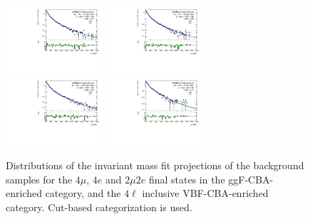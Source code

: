 \begin{figure}[htbp]
    \centering
    \includegraphics[width=0.32\textwidth]{figures/HMHZZ/background/cut_based/bkg_shape_ggZZ_ggF_4mu_180_to_2200_log.pdf}
    \includegraphics[width=0.32\textwidth]{figures/HMHZZ/background/cut_based/bkg_shape_ggZZ_ggF_4e_185_to_2200_log.pdf} \\
    \includegraphics[width=0.32\textwidth]{figures/HMHZZ/background/cut_based/bkg_shape_ggZZ_ggF_2mu2e_185_to_2200_log.pdf}
    \includegraphics[width=0.32\textwidth]{figures/HMHZZ/background/cut_based/bkg_shape_ggZZ_VBF_incl_180_to_2200_log.pdf}
    \caption{Distributions of the \mfl invariant mass fit projections of the \ggZZ background samples for the $4\mu$,
    $4e$ and $2\mu 2e$ final states in the ggF-CBA-enriched category, and the $4\ell$ inclusive VBF-CBA-enriched category. 
    Cut-based categorization is used.} 
    \label{fig:ggZZ_m4l_shape_all_cut_based}
\end{figure}

